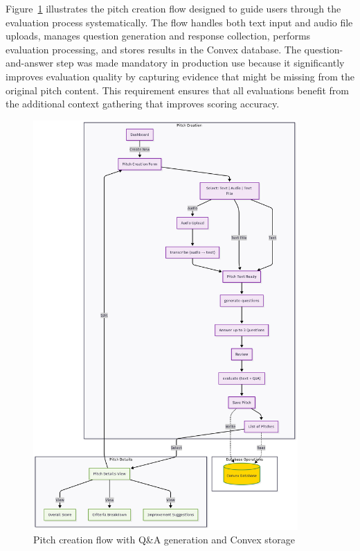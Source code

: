 Figure~\ref{fig:user-flow-pitch} illustrates the pitch creation flow designed to guide users through the evaluation process systematically. The flow handles both text input and audio file uploads, manages question generation and response collection, performs evaluation processing, and stores results in the Convex database. The question-and-answer step was made mandatory in production use because it significantly improves evaluation quality by capturing evidence that might be missing from the original pitch content. This requirement ensures that all evaluations benefit from the additional context gathering that improves scoring accuracy.

\begin{figure}[H]
  \centering
  \includegraphics[width=0.9\textwidth]{img/user-flow-pitch}
\caption{Pitch creation flow with Q\&A generation and Convex storage}
  \label{fig:user-flow-pitch}
\end{figure}

